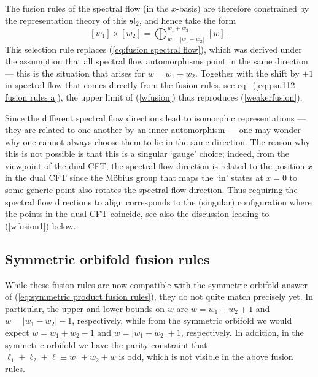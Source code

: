 \documentclass[12pt,a4paper]{article}
\newcommand{\be}{\begin{equation}}
\newcommand{\ee}{\end{equation}}
\begin{document}
The fusion rules of the spectral flow (in the $x$-basis) are therefore constrained by the representation theory of this $\mathfrak{sl}_2$, and hence take the form
\be\label{wfusion}
[w_1] \times [w_2] = \bigoplus_{w=|w_1-w_2|}^{w_1 + w_2} \, [w] \ . 
\ee
This selection rule replaces (\ref{eq:fusion spectral flow}), which was derived under the assumption that all spectral flow automorphisms point in the same direction --- this is the situation that arises for $w=w_1 + w_2$. 
Together with the shift by $\pm 1$ in spectral flow that comes directly from the fusion rules, see eq.~(\ref{eq:psu112 fusion rules a}), the upper limit of (\ref{wfusion}) thus reproduces (\ref{weakerfusion}).

Since the different spectral flow directions lead to isomorphic representations --- they are related to one another by an inner automorphism --- one may wonder why one cannot always choose them to lie in the same direction. The reason why this is not possible is that this is a singular `gauge' choice; indeed, from the viewpoint of the dual CFT, the spectral flow direction is related to the position $x$ in the dual CFT since the M\"obius group that maps the `in' states at $x=0$ to some generic point also rotates the spectral flow direction. Thus requiring the spectral flow directions to align corresponds to the (singular) configuration where the points in the dual CFT coincide, see also the discussion leading to (\ref{wfusion1}) below.


\subsection{Symmetric orbifold fusion rules}\label{sec:6.2}

While these fusion rules are now compatible with the symmetric orbifold answer of (\ref{eq:symmetric product fusion rules}), they do not quite match precisely yet. In particular, the upper and lower bounds on $w$ are $w=w_1+w_2+1$ and $w=|w_1-w_2|-1$, respectively, while from the symmetric orbifold we would expect $w=w_1+w_2-1$ and $w=|w_1-w_2|+1$, respectively. In addition, in the symmetric orbifold we have the parity constraint that $\ell_1+\ell_2+\ell \equiv w_1 + w_2 + w$ is odd, which is not visible in the above fusion rules. 
\end{document}
